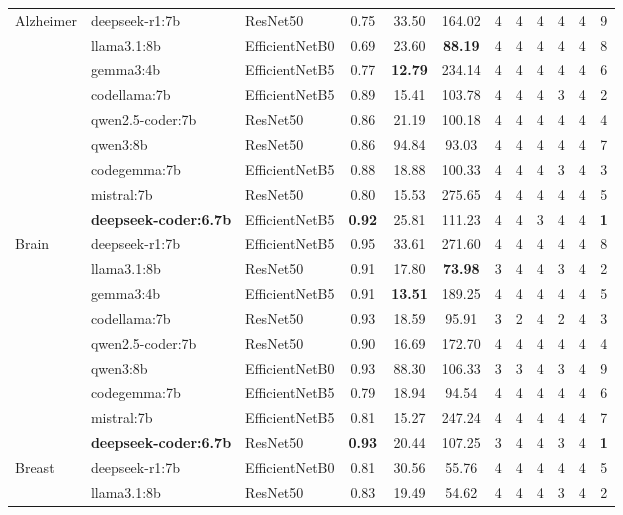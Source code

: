 \documentclass{article}
\begin{document}
\begin{small}
\begin{tabularx}{\textwidth}{l l l c c c c c c c c c}
\multirow{9}{*}{Alzheimer}
 & deepseek-r1:7b & ResNet50 & 0.75 & 33.50 & 164.02 & 4 & 4 & 4 & 4 & 4 & 9 \\
 & llama3.1:8b & EfficientNetB0 & 0.69 & 23.60 & \textbf{88.19} & 4 & 4 & 4 & 4 & 4 & 8 \\
 & gemma3:4b & EfficientNetB5 & 0.77 & \textbf{12.79} & 234.14 & 4 & 4 & 4 & 4 & 4 & 6 \\
 & codellama:7b & EfficientNetB5 & 0.89 & 15.41 & 103.78 & 4 & 4 & 4 & 3 & 4 & 2 \\
 & qwen2.5-coder:7b & ResNet50 & 0.86 & 21.19 & 100.18 & 4 & 4 & 4 & 4 & 4 & 4 \\
 & qwen3:8b & ResNet50 & 0.86 & 94.84 & 93.03 & 4 & 4 & 4 & 4 & 4 & 7 \\
 & codegemma:7b & EfficientNetB5 & 0.88 & 18.88 & 100.33 & 4 & 4 & 4 & 3 & 4 & 3 \\
 & mistral:7b & ResNet50 & 0.80 & 15.53 & 275.65 & 4 & 4 & 4 & 4 & 4 & 5 \\
 & \textbf{deepseek-coder:6.7b} & EfficientNetB5 & \textbf{0.92} & 25.81 & 111.23 & 4 & 4 & 3 & 4 & 4 & \textbf{1} \\
\midrule
\multirow{9}{*}{Brain}
 & deepseek-r1:7b & EfficientNetB5 & 0.95 & 33.61 & 271.60 & 4 & 4 & 4 & 4 & 4 & 8 \\
 & llama3.1:8b & ResNet50 & 0.91 & 17.80 & \textbf{73.98} & 3 & 4 & 4 & 3 & 4 & 2 \\
 & gemma3:4b & EfficientNetB5 & 0.91 & \textbf{13.51} & 189.25 & 4 & 4 & 4 & 4 & 4 & 5 \\
 & codellama:7b & ResNet50 & 0.93 & 18.59 & 95.91 & 3 & 2 & 4 & 2 & 4 & 3 \\
 & qwen2.5-coder:7b & ResNet50 & 0.90 & 16.69 & 172.70 & 4 & 4 & 4 & 4 & 4 & 4 \\
 & qwen3:8b & EfficientNetB0 & 0.93 & 88.30 & 106.33 & 3 & 3 & 4 & 3 & 4 & 9 \\
 & codegemma:7b & EfficientNetB5 & 0.79 & 18.94 & 94.54 & 4 & 4 & 4 & 4 & 4 & 6 \\
 & mistral:7b & EfficientNetB5 & 0.81 & 15.27 & 247.24 & 4 & 4 & 4 & 4 & 4 & 7 \\
 & \textbf{deepseek-coder:6.7b} & ResNet50 & \textbf{0.93} & 20.44 & 107.25 & 3 & 4 & 4 & 3 & 4 & \textbf{1} \\
\midrule
\multirow{9}{*}{Breast}
 & deepseek-r1:7b & EfficientNetB0 & 0.81 & 30.56 & 55.76 & 4 & 4 & 4 & 4 & 4 & 5 \\
 & llama3.1:8b & ResNet50 & 0.83 & 19.49 & 54.62 & 4 & 4 & 4 & 3 & 4 & 2 \\

\end{tabularx}
\end{small}
\end{document}
